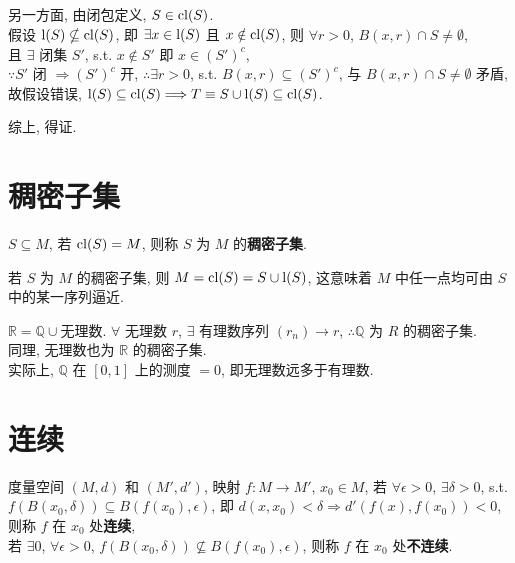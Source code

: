 \documentclass{note}
\begin{document}
\begin{pf}
\begin{itemize}
        另一方面, 由闭包定义, $S\in\operatorname{cl}(S)$.\\
        假设 $\operatorname{l}(S)\nsubseteq\operatorname{cl}(S)$, 即 $\exists x\in\operatorname{l}(S)$ 且 $x\notin\operatorname{cl}(S)$, 则 $\forall r>0$, $B(x,r)\cap S\neq\emptyset$,\\
        且 $\exists$ 闭集 $S'$, s.t. $x\notin S'$ 即 $x\in(S')^c$,\\
        $\because S'$ 闭 $\Longrightarrow(S')^c$ 开, $\therefore\exists r>0$, s.t. $B(x,r)\subseteq(S')^c$, 与 $B(x,r)\cap S\neq\emptyset$ 矛盾, 故假设错误, $\operatorname{l}(S)\subseteq\operatorname{cl}(S)\Longrightarrow T\equiv S\cup\operatorname{l}(S)\subseteq\operatorname{cl}(S)$.

        综上, 得证.
    \end{itemize}
\end{pf}

\section{稠密子集}
\begin{df}[稠密子集]
    $S\subseteq M$, 若 $\operatorname{cl}(S)=M$, 则称 $S$ 为 $M$ 的\textbf{稠密子集}.
\end{df}

若 $S$ 为 $M$ 的稠密子集, 则 $M=\operatorname{cl}(S)=S\cup\operatorname{l}(S)$, 这意味着 $M$ 中任一点均可由 $S$ 中的某一序列逼近.

\begin{eg}
    $\mathbb{R}=\mathbb{Q}\cup$无理数. $\forall$ 无理数 $r$, $\exists$ 有理数序列 $(r_n)\rightarrow r$, $\therefore\mathbb{Q}$ 为 $R$ 的稠密子集.\\
    同理, 无理数也为 $\mathbb{R}$ 的稠密子集.\\
    实际上, $\mathbb{Q}$ 在 $[0,1]$ 上的测度 $=0$, 即无理数远多于有理数.
\end{eg}

\section{连续}
\begin{df}[连续和不连续]
    度量空间 $(M,d)$ 和 $(M',d')$, 映射 $f:M\rightarrow M'$, $x_0\in M$, 若 $\forall\epsilon>0$, $\exists\delta>0$, s.t. $f(B(x_0,\delta))\subseteq B(f(x_0),\epsilon)$, 即 $d(x,x_0)<\delta\Longrightarrow d'(f(x),f(x_0))<0$, 则称 $f$ 在 $x_0$ 处\textbf{连续},\\
    若 $\exists 0$, $\forall\epsilon>0$, $f(B(x_0,\delta))\nsubseteq B(f(x_0),\epsilon)$, 则称 $f$ 在 $x_0$ 处\textbf{不连续}.
\end{df}
\end{document}
